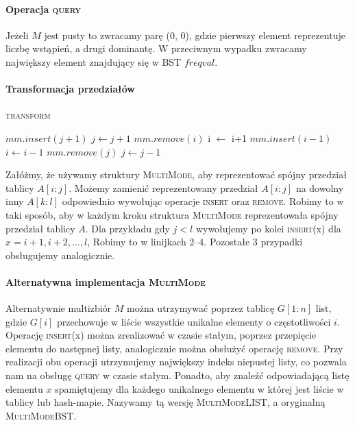 \paragraph{Operacja \textsc{query}}
Jeżeli $M$ jest pusty to zwracamy parę (0, 0), gdzie pierwszy element reprezentuje liczbę wstąpień, a drugi dominantę. W przeciwnym wypadku zwracamy największy element znajdujący się w BST $freqval$.

\paragraph{Transformacja przedziałów}
\begin{algorithm}[H]
    \caption{\textsc{transform}}
    \label{alg:offline-transform}
    \begin{algorithmic}[1]
                \State $mm.insert(j+1)$
                \State $j \gets j+1$
            \EndWhile
                \State $mm.remove(i)$
                \State i $\gets$ i+1
            \EndWhile
                \State $mm.insert(i-1)$
                \State $i \gets i-1$
            \EndWhile
                \State $mm.remove(j)$
                \State $j \gets j-1$
            \EndWhile
        \EndFunction
    \end{algorithmic}
\end{algorithm}
Załóżmy, że używamy struktury \textsc{MultiMode}, aby reprezentować spójny przedział tablicy $A[i:j]$. Możemy zamienić reprezentowany przedział $A[i:j]$ na dowolny inny $A[k:l]$ odpowiednio wywołując operacje \textsc{insert} oraz \textsc{remove}. Robimy to w taki sposób, aby w każdym kroku struktura \textsc{MultiMode} reprezentowała spójny przedział tablicy $A$. Dla przykładu gdy $j < l$ wywołujemy po kolei \textsc{insert}(x) dla $x=i+1,i+2,\dots,l$, Robimy to w linijkach 2--4. Pozostałe 3 przypadki obsługujemy analogicznie.

\paragraph{Alternatywna implementacja \textsc{MultiMode}} Alternatywnie multizbiór $M$ można utrzymywać poprzez tablicę $G[1:n]$ list, gdzie $G[i]$ przechowuje w liście wszystkie unikalne elementy o częstotliwości $i$. Operację \textsc{insert}(x) można zrealizować w czasie stałym, poprzez przepięcie elementu do następnej listy, analogicznie można obsłużyć operację \textsc{remove}. Przy realizacji obu operacji utrzymujemy największy indeks niepustej listy, co pozwala nam na obsługę \textsc{query} w czasie stałym. Ponadto, aby znaleźć odpowiadającą listę elementu $x$ spamiętujemy dla każdego unikalnego elementu w której jest liście w tablicy lub hash-mapie. Nazywamy tą wersję \textsc{MultiModeLIST}, a oryginalną \textsc{MultiModeBST}.


